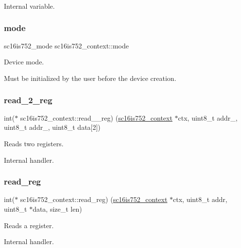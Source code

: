 Internal variable. \mbox{\label{structsc16is752__context_add412f350fe7dda7fd90ceccb712623e}} 
\subsubsection{\texorpdfstring{mode}{mode}}
{\footnotesize\ttfamily sc16is752\+\_\+mode sc16is752\+\_\+context\+::mode}



Device mode. 

Must be initialized by the user before the device creation. \mbox{\label{structsc16is752__context_a97f6562fd545b007bb81264b54e06e5e}} 
\subsubsection{\texorpdfstring{read\_2\_reg}{read\_2\_reg}}
{\footnotesize\ttfamily int($\ast$ sc16is752\+\_\+context\+::read\+\_\+\_\+reg) (\mbox{\hyperlink{structsc16is752__context}{sc16is752\+\_\+context}} $\ast$ctx, uint8\+\_\+t addr\+\_, uint8\+\_\+t addr\+\_, uint8\+\_\+t data\mbox{[}2\mbox{]})}



Reads two registers. 

Internal handler. \mbox{\label{structsc16is752__context_aa0f05147040b5c016ebdc5779a52b97d}} 
\subsubsection{\texorpdfstring{read\_reg}{read\_reg}}
{\footnotesize\ttfamily int($\ast$ sc16is752\+\_\+context\+::read\+\_\+reg) (\mbox{\hyperlink{structsc16is752__context}{sc16is752\+\_\+context}} $\ast$ctx, uint8\+\_\+t addr, uint8\+\_\+t $\ast$data, size\+\_\+t len)}



Reads a register. 

Internal handler. \mbox{\label{structsc16is752__context_aa3fad3393152614991abdf937f984141}} 
